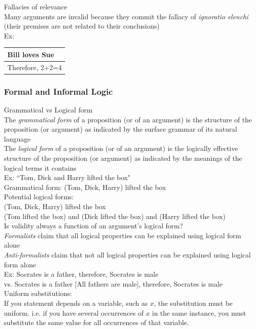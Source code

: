 \documentclass[11pt, fleqn]{article}
\begin{document}
Fallacies of relevance\\
Many arguments are invalid because they commit the fallacy of \textit{ignoratio elenchi} (their premises are not related to their conclusions)\\
Ex:\\
\begin{tabular}{p{4cm}}
    Bill loves Sue\\
    \hline
    Therefore, 2+2=4
\end{tabular}

\subsubsection{Formal and Informal Logic}

Grammatical vs Logical form\\
The \textit{grammatical form} of a proposition (or of an argument) is the structure of the proposition (or argument) as indicated by the surface grammar of its natural language\\
The \textit{logical form} of a proposition (or of an argument) is the logically effective structure of the proposition (or argument) as indicated by the meanings of the logical terms it contains\\
Ex: ``Tom, Dick and Harry lifted the box"\\
Grammatical form: (Tom, Dick, Harry) lifted the box\\
Potential logical forms:\\
(Tom, Dick, Harry) lifted the box\\
(Tom lifted the box) and (Dick lifted the box) and (Harry lifted the box)\\

Is validity always a function of an argument's logical form?\\
\textit{Formalists} claim that all logical properties can be explained using logical form alone\\
\textit{Anti-formalists} claim that not all logical properties can be explained using logical form alone\\
Ex: Socrates is a father, therefore, Socrates is male\\
vs. Socrates is a father [All fathers are male], therefore, Socrates is male\\

Uniform substitutions:\\
If you statement depends on a variable, such as $x$, the substitution must be uniform. i.e. if you have several occurrences of $x$ in the same instance, you must substitute the same value for all occurrences of that variable.\\
\end{document}
